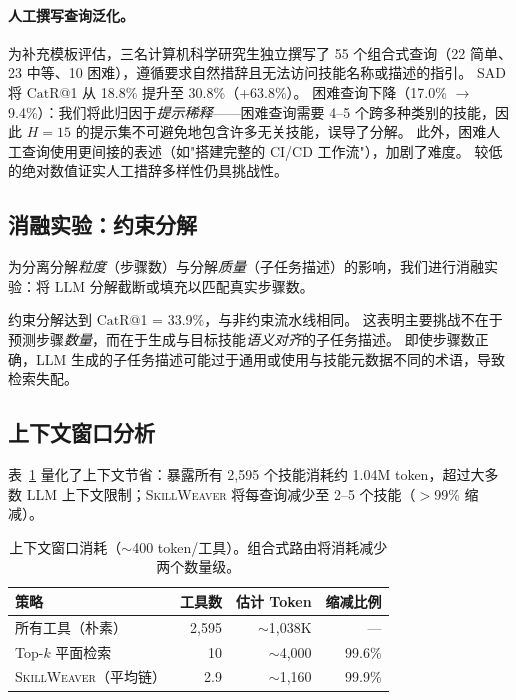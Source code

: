 \documentclass[11pt,a4paper]{ctexart}
\newcommand{\system}{\textsc{SkillWeaver}}
\newcommand{\catrecall}{\text{CatR}}
\begin{document}
\paragraph{人工撰写查询泛化。}
为补充模板评估，三名计算机科学研究生独立撰写了 55 个组合式查询（22 简单、23 中等、10 困难），遵循要求自然措辞且无法访问技能名称或描述的指引。
SAD 将 $\catrecall$@1 从 18.8\% 提升至 30.8\%（+63.8\%）。
困难查询下降（17.0\% $\to$ 9.4\%）：我们将此归因于\emph{提示稀释}——困难查询需要 4--5 个跨多种类别的技能，因此 $H{=}15$ 的提示集不可避免地包含许多无关技能，误导了分解。
此外，困难人工查询使用更间接的表述（如"搭建完整的 CI/CD 工作流"），加剧了难度。
较低的绝对数值证实人工措辞多样性仍具挑战性。

\subsection{消融实验：约束分解}

为分离分解\emph{粒度}（步骤数）与分解\emph{质量}（子任务描述）的影响，我们进行消融实验：将 LLM 分解截断或填充以匹配真实步骤数。

约束分解达到 $\catrecall$@1 = 33.9\%，与非约束流水线相同。
这表明主要挑战不在于预测步骤\emph{数量}，而在于生成与目标技能\emph{语义对齐}的子任务描述。
即使步骤数正确，LLM 生成的子任务描述可能过于通用或使用与技能元数据不同的术语，导致检索失配。

\subsection{上下文窗口分析}
\label{sec:context}

表~\ref{tab:context} 量化了上下文节省：暴露所有 2{,}595 个技能消耗约 1.04M token，超过大多数 LLM 上下文限制；\system{} 将每查询减少至 2--5 个技能（$>$99\% 缩减）。

\begin{table}[t]
\centering
\small
\begin{tabular}{lrrr}
\toprule
\textbf{策略} & \textbf{工具数} & \textbf{估计 Token} & \textbf{缩减比例} \\
\midrule
所有工具（朴素） & 2{,}595 & $\sim$1{,}038K & --- \\
Top-$k$ 平面检索 & 10 & $\sim$4{,}000 & 99.6\% \\
\system{}（平均链） & 2.9 & $\sim$1{,}160 & 99.9\% \\
\bottomrule
\end{tabular}
\caption{上下文窗口消耗（$\sim$400 token/工具）。组合式路由将消耗减少两个数量级。}
\label{tab:context}
\end{table}
\end{document}
